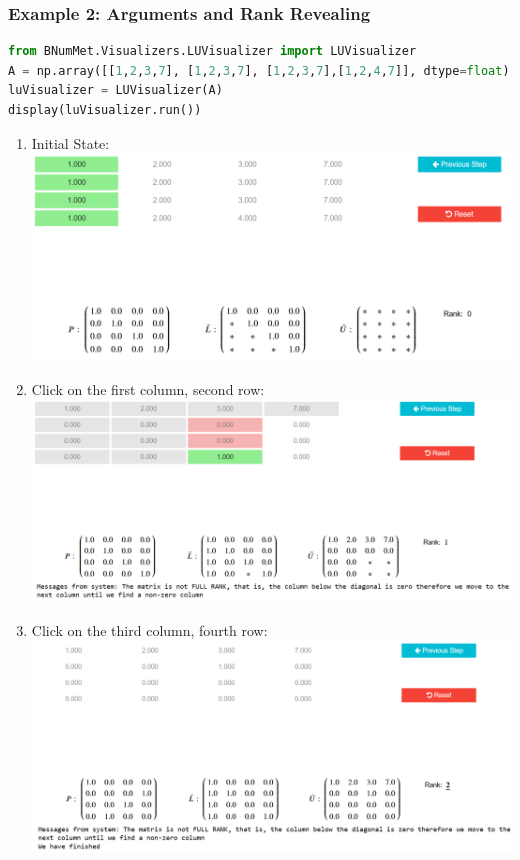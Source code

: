 \subsubsection{Example 2: Arguments and Rank Revealing}{
\begin{lstlisting}[language=Python]
from BNumMet.Visualizers.LUVisualizer import LUVisualizer
A = np.array([[1,2,3,7], [1,2,3,7], [1,2,3,7],[1,2,4,7]], dtype=float)
luVisualizer = LUVisualizer(A)
display(luVisualizer.run())
\end{lstlisting}

\begin{enumerate}
\item Initial State: \\
\includegraphics[scale=0.45]{Include/Images/Thesis/Documentation/Visualizers/LUVisualizer/Example 2/Example 2 - 00 - Initial State.png}

\item Click on the first column, second row: \\
\includegraphics[scale=0.4]{Include/Images/Thesis/Documentation/Visualizers/LUVisualizer/Example 2/Example 2 - 01 - Click first column, second row.png}

\item Click on the third column, fourth row: \\
\includegraphics[scale=0.4]{Include/Images/Thesis/Documentation/Visualizers/LUVisualizer/Example 2/Example 2 - 02 - Click thirdcolumn, fourth row.png}
\end{enumerate}
}


